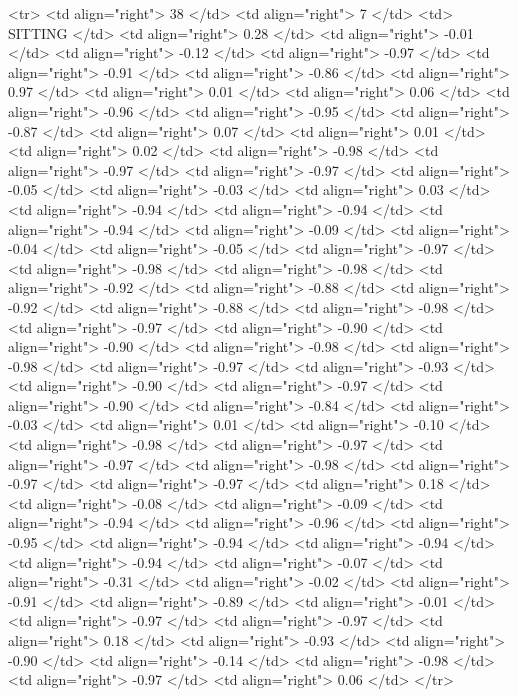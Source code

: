   <tr> <td align="right"> 38 </td> <td align="right">   7 </td> <td> SITTING </td> <td align="right"> 0.28 </td> <td align="right"> -0.01 </td> <td align="right"> -0.12 </td> <td align="right"> -0.97 </td> <td align="right"> -0.91 </td> <td align="right"> -0.86 </td> <td align="right"> 0.97 </td> <td align="right"> 0.01 </td> <td align="right"> 0.06 </td> <td align="right"> -0.96 </td> <td align="right"> -0.95 </td> <td align="right"> -0.87 </td> <td align="right"> 0.07 </td> <td align="right"> 0.01 </td> <td align="right"> 0.02 </td> <td align="right"> -0.98 </td> <td align="right"> -0.97 </td> <td align="right"> -0.97 </td> <td align="right"> -0.05 </td> <td align="right"> -0.03 </td> <td align="right"> 0.03 </td> <td align="right"> -0.94 </td> <td align="right"> -0.94 </td> <td align="right"> -0.94 </td> <td align="right"> -0.09 </td> <td align="right"> -0.04 </td> <td align="right"> -0.05 </td> <td align="right"> -0.97 </td> <td align="right"> -0.98 </td> <td align="right"> -0.98 </td> <td align="right"> -0.92 </td> <td align="right"> -0.88 </td> <td align="right"> -0.92 </td> <td align="right"> -0.88 </td> <td align="right"> -0.98 </td> <td align="right"> -0.97 </td> <td align="right"> -0.90 </td> <td align="right"> -0.90 </td> <td align="right"> -0.98 </td> <td align="right"> -0.98 </td> <td align="right"> -0.97 </td> <td align="right"> -0.93 </td> <td align="right"> -0.90 </td> <td align="right"> -0.97 </td> <td align="right"> -0.90 </td> <td align="right"> -0.84 </td> <td align="right"> -0.03 </td> <td align="right"> 0.01 </td> <td align="right"> -0.10 </td> <td align="right"> -0.98 </td> <td align="right"> -0.97 </td> <td align="right"> -0.97 </td> <td align="right"> -0.98 </td> <td align="right"> -0.97 </td> <td align="right"> -0.97 </td> <td align="right"> 0.18 </td> <td align="right"> -0.08 </td> <td align="right"> -0.09 </td> <td align="right"> -0.94 </td> <td align="right"> -0.96 </td> <td align="right"> -0.95 </td> <td align="right"> -0.94 </td> <td align="right"> -0.94 </td> <td align="right"> -0.94 </td> <td align="right"> -0.07 </td> <td align="right"> -0.31 </td> <td align="right"> -0.02 </td> <td align="right"> -0.91 </td> <td align="right"> -0.89 </td> <td align="right"> -0.01 </td> <td align="right"> -0.97 </td> <td align="right"> -0.97 </td> <td align="right"> 0.18 </td> <td align="right"> -0.93 </td> <td align="right"> -0.90 </td> <td align="right"> -0.14 </td> <td align="right"> -0.98 </td> <td align="right"> -0.97 </td> <td align="right"> 0.06 </td> </tr>
